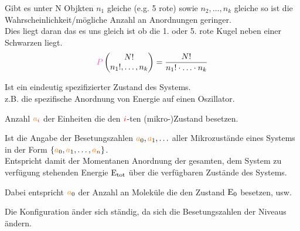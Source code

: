 \begin{defnbox}\nospacing
  \begin{defn}
    Gibt es unter N Objkten $n_1$ gleiche (e.g. 5 rote) sowie $n_2,\ldots,n_k$ gleiche so ist die Wahrscheinlichkeit/mögliche Anzahl an Anordnungen geringer.\\
    Dies liegt daran das es uns gleich ist ob die 1. oder 5. rote Kugel neben einer Schwarzen liegt.
    \begin{align}
      \Pb\vect{N! \\ n_1!,\ldots,n_k}=\frac{N!}{n_1!\cdot\ldots\cdot n_k}\label{eq:MultinominalKoef}
    \end{align}
  \end{defn}
\end{defnbox}
\begin{defnbox}\nospacing
  \begin{defn}[Mikrozustand]
    Ist ein eindeutig spezifizierter Zustand des Systems. \\
    z.B. die spezifische Anordnung von Energie auf einen Oszillator.
  \end{defn}
\end{defnbox}
\begin{defnbox}\nospacing
  \begin{defn}
    Anzahl $\mca_{\idxi}$ der Einheiten die den $\idxi$-ten (mikro-)Zustand besetzen.
  \end{defn}
\end{defnbox}
\begin{defnbox}\nospacing
  \begin{defn}
    Ist die Angabe der Besetungszahlen $\mca_0,\mca_1,\ldots$ aller Mikrozustände eines Systems in der Form $\{\mca_0,\mca_1,\ldots,\mca_{\idxn}\}$.\\
    Entspricht damit der Momentanen Anordnung der gesamten, dem System zu verfügung stehenden Energie $\mathrm{E}_{\text{tot}}$ über die verfügbaren Zustände des Systems.
  \end{defn}
\end{defnbox}
\begin{notebox}[Bemerkung]\nospacing
  \begin{numberlist}
      \item Dabei entspricht $\mca_0$ der Anzahl an Moleküle die den Zustand $\mathrm{E}_0$ besetzen, usw.
    \item Die Konfiguration änder sich ständig, da sich die Besetungszahlen der Niveaus ändern.
  \end{numberlist}
\end{notebox}
